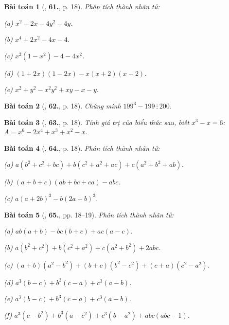 \documentclass{article}
\numberwithin{equation}{section}
\newtheorem{baitoan}{Bài toán}[section]
\begin{document}
\begin{baitoan}[\cite{Binh_Toan_8_tap_1}, \textbf{61.}, p. 18]
	Phân tích thành nhân tử:
	\begin{enumerate*}
		\item[(a)] $x^2 - 2x - 4y^2 - 4y$.
		\item[(b)] $x^4 + 2x^2 - 4x - 4$.
		\item[(c)] $x^2(1 - x^2) - 4 - 4x^2$.
		\item[(d)] $(1 + 2x)(1 - 2x) - x(x + 2)(x - 2)$.
		\item[(e)] $x^2 + y^2 - x^2y^2 + xy - x - y$.
	\end{enumerate*}
\end{baitoan}

\begin{baitoan}[\cite{Binh_Toan_8_tap_1}, \textbf{62.}, p. 18]
	Chứng minh $199^3 - 199\ \vdots\ 200$.
\end{baitoan}

\begin{baitoan}[\cite{Binh_Toan_8_tap_1}, \textbf{63.}, p. 18]
	Tính giá trị của biểu thức sau, biết $x^3 - x = 6$: $A = x^6 - 2x^4 + x^3 + x^2 - x$.
\end{baitoan}

\begin{baitoan}[\cite{Binh_Toan_8_tap_1}, \textbf{64.}, p. 18]
	Phân tích thành nhân tử:
	\begin{enumerate*}
		\item[(a)] $a(b^2 + c^2 + bc) + b(c^2 + a^2 + ac) + c(a^2 + b^2 + ab)$.
		\item[(b)] $(a + b + c)(ab + bc + ca) - abc$.
		\item[(c)] $a(a + 2b)^3 - b(2a + b)^3$.
	\end{enumerate*}
\end{baitoan}

\begin{baitoan}[\cite{Binh_Toan_8_tap_1}, \textbf{65.}, pp. 18--19]
	Phân tích thành nhân tử:\\
	\begin{enumerate*}
		\item[(a)] $ab(a + b) - bc(b + c) + ac(a - c)$.
		\item[(b)] $a(b^2 + c^2) + b(c^2 + a^2) + c(a^2 + b^2) + 2abc$.
		\item[(c)] $(a + b)(a^2 - b^2) + (b + c)(b^2 - c^2) + (c + a)(c^2 - a^2)$.
		\item[(d)] $a^3(b - c) + b^3(c - a) + c^3(a - b)$.
		\item[(e)] $a^3(b - c) + b^3(c - a) + c^3(a - b)$.
		\item[(f)] $a^3(c - b^2) + b^3(a - c^2) + c^3(b - a^2) + abc(abc - 1)$.
	\end{enumerate*}
\end{baitoan}
\end{document}
